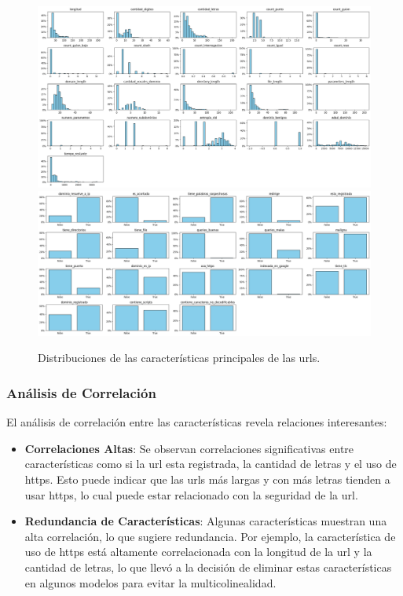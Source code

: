 \begin{figure}[H]
    \centering
    \includegraphics[width=\textwidth]{histogram1.png}
    \includegraphics[width=\textwidth]{histogram2.png}
    \caption{Distribuciones de las características principales de las \glspl{url}.}
    \label{fig:histograms}
\end{figure}

\subsubsection*{Análisis de Correlación}

El análisis de correlación entre las características revela relaciones interesantes:

\begin{itemize}
    \item \textbf{Correlaciones Altas}: 
    Se observan correlaciones significativas entre características como si la \gls{url} esta registrada, la cantidad de letras y el uso de \gls{https}. Esto puede indicar que las \glspl{url} más largas y con más letras tienden a usar \gls{https}, lo cual puede estar relacionado con la seguridad de la \gls{url}.

    \item \textbf{Redundancia de Características}: 
    Algunas características muestran una alta correlación, lo que sugiere redundancia. Por ejemplo, la característica de uso de \gls{https} está altamente correlacionada con la longitud de la \gls{url} y la cantidad de letras, lo que llevó a la decisión de eliminar estas características en algunos modelos para evitar la multicolinealidad.
\end{itemize}


